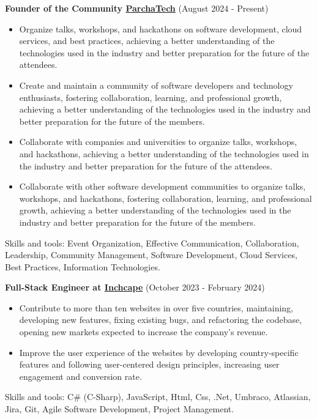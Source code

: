   \vspace{0.2cm}
  \textbf{Founder of the Community \href{https://www.parcha.tech/}{ParchaTech}} (August 2024 - Present)
  \hfill
  \vspace{0.2cm}
  \begin{minipage}{\linewidth}
    \begin{itemize}[noitemsep]
      \item Organize talks, workshops, and hackathons on software development, cloud services, and best practices, achieving a better understanding of the technologies used in the industry and better preparation for the future of the attendees.
      \item Create and maintain a community of software developers and technology enthusiasts, fostering collaboration, learning, and professional growth, achieving a better understanding of the technologies used in the industry and better preparation for the future of the members.
      \item Collaborate with companies and universities to organize talks, workshops, and hackathons, achieving a better understanding of the technologies used in the industry and better preparation for the future of the attendees.
      \item Collaborate with other software development communities to organize talks, workshops, and hackathons, fostering collaboration, learning, and professional growth, achieving a better understanding of the technologies used in the industry and better preparation for the future of the members.
    \end{itemize}
    \hfill
  \end{minipage}
  Skills and tools: Event Organization, Effective Communication, Collaboration, Leadership, Community Management, Software Development, Cloud Services, Best Practices, Information Technologies.
  \newpage

  \vspace*{0.2cm}
  \textbf{Full-Stack Engineer at \href{https://www.inchcape.com/}{Inchcape}} (October 2023 - February 2024)
  \hfill
  \vspace*{0.2cm}
  \begin{minipage}{\linewidth}
    \begin{itemize}[noitemsep]
      \item Contribute to more than ten websites in over five countries, maintaining, developing new features, fixing existing bugs, and refactoring the codebase, opening new markets expected to increase the company's revenue.
      \item Improve the user experience of the websites by developing country-specific features and following user-centered design principles, increasing user engagement and conversion rate.
    \end{itemize}
    \hfill
  \end{minipage}
  Skills and tools: C\# (C-Sharp), JavaScript, Html, Css, .Net, Umbraco, Atlassian, Jira, Git, Agile Software Development, Project Management.


